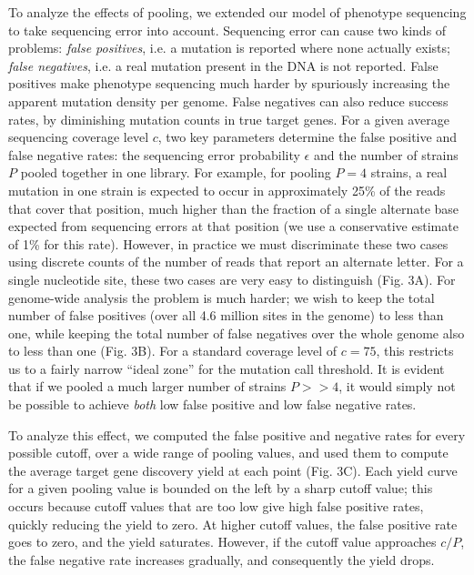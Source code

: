 \documentclass[letterpaper,10pt,english]{howto}
\begin{document}
To analyze the effects of pooling, we extended our model of
phenotype sequencing to take sequencing error into account.
Sequencing error can cause two kinds of problems:
\emph{false positives}, i.e. a mutation is reported where none
actually exists; \emph{false negatives}, i.e. a real mutation present
in the DNA is not reported.  False positives make phenotype
sequencing much harder by spuriously increasing the apparent
mutation density per genome.  False negatives can also reduce
success rates, by diminishing mutation counts in true target genes.
For a given average sequencing coverage
level $c$, two key parameters determine the false positive and false
negative rates: the sequencing error probability $\epsilon$
and the number of strains $P$ pooled together in one library.
For example, for pooling $P=4$ strains, a
real mutation in one strain is expected to occur in approximately 25\%
of the reads that cover that position, much higher than
the fraction of a single alternate base expected from
sequencing errors at that position (we use a conservative
estimate of 1\% for this rate).  However, in practice we must discriminate
these two cases using discrete counts of the number
of reads that report an alternate letter.  For a single
nucleotide site, these two cases are very easy to distinguish
(Fig. 3A).  For genome-wide analysis the problem
is much harder; we wish to keep the total number of false
positives (over all 4.6 million sites in the genome) to less
than one, while keeping the total number of false negatives
over the whole genome also to less than one (Fig. 3B).  For
a standard coverage level of $c=75$, this restricts us
to a fairly narrow ``ideal zone'' for the mutation call threshold.
It is evident that if we pooled a much larger
number of strains $P >> 4$, it would simply not be possible
to achieve \emph{both} low false positive and low false negative rates.

To analyze this effect, we computed the false positive and negative
rates for every possible cutoff, over a wide range of pooling values,
and used them to compute the average target gene discovery yield
at each point (Fig. 3C).  Each yield curve for a given pooling value
is bounded on the left by a sharp cutoff value; this occurs because cutoff
values that are too low give high false positive rates, quickly
reducing the yield to zero.  At higher cutoff values,
the false positive rate goes to zero, and the yield saturates.
However, if the cutoff value approaches $c/P$, the false
negative rate increases gradually, and consequently the yield drops.
\end{document}
